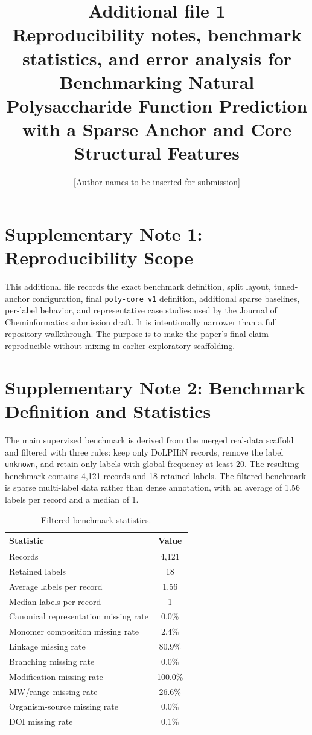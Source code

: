 \documentclass{article}
\title{Additional file 1\\Reproducibility notes, benchmark statistics, and error analysis for\\Benchmarking Natural Polysaccharide Function Prediction with a Sparse Anchor and Core Structural Features}
\author{[Author names to be inserted for submission]}
\date{}
\begin{document}
\maketitle
\doublespacing
\linenumbers

\section{Supplementary Note 1: Reproducibility Scope}

This additional file records the exact benchmark definition, split layout, tuned-anchor configuration, final \texttt{poly-core v1} definition, additional sparse baselines, per-label behavior, and representative case studies used by the Journal of Cheminformatics submission draft. It is intentionally narrower than a full repository walkthrough. The purpose is to make the paper's final claim reproducible without mixing in earlier exploratory scaffolding.

\section{Supplementary Note 2: Benchmark Definition and Statistics}

The main supervised benchmark is derived from the merged real-data scaffold and filtered with three rules: keep only DoLPHiN records, remove the label \texttt{unknown}, and retain only labels with global frequency at least 20. The resulting benchmark contains 4,121 records and 18 retained labels. The filtered benchmark is sparse multi-label data rather than dense annotation, with an average of 1.56 labels per record and a median of 1.

\begin{table}[h]
\centering
\caption{Filtered benchmark statistics.}
\begin{tabular}{lc}
\toprule
Statistic & Value \\
\midrule
Records & 4,121 \\
Retained labels & 18 \\
Average labels per record & 1.56 \\
Median labels per record & 1 \\
Canonical representation missing rate & 0.0\% \\
Monomer composition missing rate & 2.4\% \\
Linkage missing rate & 80.9\% \\
Branching missing rate & 0.0\% \\
Modification missing rate & 100.0\% \\
MW/range missing rate & 26.6\% \\
Organism-source missing rate & 0.0\% \\
DOI missing rate & 0.1\% \\
\bottomrule
\end{tabular}
\end{table}
\end{document}
